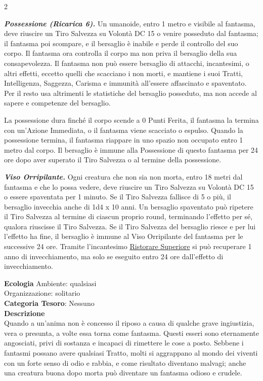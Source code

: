 \begin{multicols}{2}
{\emph{\textbf{Possessione (Ricarica 6).}} Un umanoide, entro 1 metro e visibile al fantasma, deve riuscire un Tiro Salvezza su Volontà DC 15 o venire posseduto dal fantasma; il fantasma poi scompare, e il bersaglio è inabile e perde il controllo del suo corpo. Il fantasma ora controlla il corpo ma non priva il bersaglio della sua consapevolezza. Il fantasma non può essere bersaglio di attacchi, incantesimi, o altri effetti, eccetto quelli che scacciano i non morti, e mantiene i suoi Tratti, Intelligenza, Saggezza, Carisma e immunità all'essere affascinato e spaventato. Per il resto usa altrimenti le statistiche del bersaglio posseduto, ma non accede al sapere e competenze del bersaglio.

La possessione dura finché il corpo scende a 0 Punti Ferita, il fantasma la termina con un'Azione Immediata, o il fantasma viene scacciato o espulso. Quando la possessione termina, il fantasma riappare in uno spazio non occupato entro 1 metro dal corpo. Il bersaglio è immune alla Possessione di questo fantasma per 24 ore dopo aver superato il Tiro Salvezza o al termine della possessione.

\emph{\textbf{Viso Orripilante.}} Ogni creatura che non sia non morta, entro 18 metri dal fantasma e che lo possa vedere, deve riuscire un Tiro Salvezza su Volontà DC 15 o essere spaventata per 1 minuto. Se il Tiro Salvezza fallisce di 5 o più, il bersaglio invecchia anche di 1d4 x 10 anni. Un bersaglio spaventato può ripetere il Tiro Salvezza al termine di ciascun proprio round, terminando l'effetto per sé, qualora riuscisse il Tiro Salvezza. Se il Tiro Salvezza del bersaglio riesce e per lui l'effetto ha fine, il bersaglio è immune al Viso Orripilante del fantasma per le successive 24 ore. Tramite l'incantesimo \hyperlink{Ristorare Superiore}{Ristorare Superiore} si può recuperare 1 anno di invecchiamento, ma solo se eseguito entro 24 ore dall'effetto di invecchiamento.

\textbf{Ecologia}
Ambiente: qualsiasi\\
Organizzazione: solitario\\
\textbf{Categoria Tesoro}: Nessuno\\
\textbf{Descrizione}\\
Quando a un'anima non è concesso il riposo a causa di qualche grave ingiustizia, vera o presunta, a volte essa torna come fantasma. Questi esseri sono eternamente angosciati, privi di sostanza e incapaci di rimettere le cose a posto. Sebbene i fantasmi possano avere qualsiasi Tratto, molti si aggrappano al mondo dei viventi con un forte senso di odio e rabbia, e come risultato diventano malvagi; anche una creatura buona dopo morta può diventare un fantasma odioso e crudele.

}
\end{multicols}
